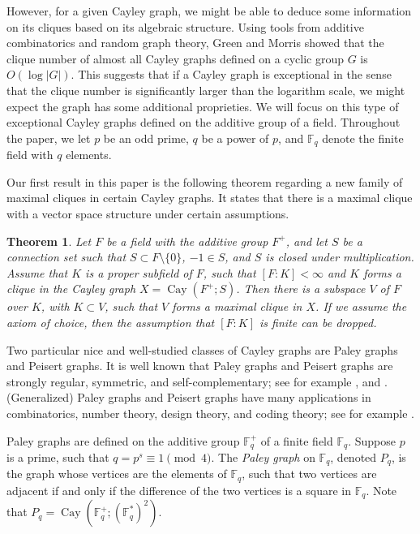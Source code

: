 \documentclass[12pt,oneside]{amsart}
\newtheorem{thm}{Theorem}[section]
\newcommand{\F}{\mathbb{F}}
\begin{document}
However, for a given Cayley graph, we might be able to deduce some information on its cliques based on its algebraic structure. Using tools from additive combinatorics and random graph theory, Green and Morris \cite{Green, GM} showed that the clique number of almost all Cayley graphs defined on a cyclic group $G$ is $O(\log |G|)$. This suggests that if a Cayley graph is exceptional in the sense that the clique number is significantly larger than the logarithm scale, we might expect the graph has some additional proprieties. We will focus on this type of exceptional Cayley graphs defined on the additive group of a field. Throughout the paper, we let $p$ be an odd prime, $q$ be a power of $p$, and $\F_q$ denote the finite field with $q$ elements.

Our first result in this paper is the following theorem regarding a new family of maximal cliques in certain Cayley graphs. It states that there is a maximal clique with a vector space structure under certain assumptions.

\begin{thm}\label{Cayleythm}
Let $F$ be a field with the additive group $F^+$, and let $S$ be a connection set such that $S \subset F \setminus \{0\}$, $-1 \in S$,  and $S$ is closed under multiplication. Assume that $K$ is a proper subfield of $F$, such that $[F:K]<\infty$ and $K$ forms a clique in the Cayley graph $X=\operatorname{Cay}(F^+;S)$. Then there is a subspace $V$ of $F$ over $K$, with $K \subset V$, such that $V$ forms a maximal clique in $X$. If we assume the axiom of choice, then the assumption that $[F:K]$ is finite can be dropped.
\end{thm}

Two particular nice and well-studied classes of Cayley graphs are Paley graphs and Peisert graphs. It is well known that Paley graphs and Peisert graphs are strongly regular, symmetric, and self-complementary; see for example \cite{WP2}, \cite[Chapter 2]{thesis} and \cite[Chapters 2 and 3]{NM}. (Generalized) Paley graphs and Peisert graphs have many applications in combinatorics, number theory,  design theory, and coding theory; see for example \cite{GJ,KR,LJ}.


Paley graphs are defined on the additive group $\F_q^+$ of a finite field $\F_q$. Suppose $p$ is a prime, such that $q=p^s \equiv 1 \pmod{4}$. The {\em Paley graph} on $\F_q$, denoted $P_q$, is the graph whose vertices are the elements of $\F_q$, such that two vertices are adjacent if and only if the difference of the two vertices is a square in $\F_q$. Note that $P_q=\operatorname{Cay}(\F_q^+;(\F_q^*)^2)$. 
\end{document}

